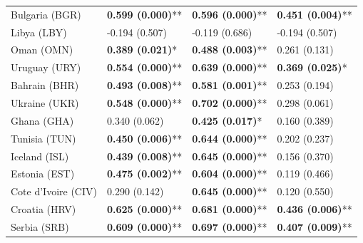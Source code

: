 \begin{longtable}{p{5cm}p{3cm}p{3cm}p{5cm}}
Bulgaria (BGR) & \textcolor{atlLime600}{\textbf{0.599 (0.000)}**} & \textcolor{atlLime600}{\textbf{0.596 (0.000)}**} & \textcolor{atlLime600}{\textbf{0.451 (0.004)}**} \\
Libya (LBY) & \textcolor{atlOrange600}{-0.194 (0.507)} & \textcolor{atlOrange600}{-0.119 (0.686)} & \textcolor{atlOrange600}{-0.194 (0.507)} \\
Oman (OMN) & \textcolor{atlLime600}{\textbf{0.389 (0.021)}*} & \textcolor{atlLime600}{\textbf{0.488 (0.003)}**} & \textcolor{atlOrange600}{0.261 (0.131)} \\
Uruguay (URY) & \textcolor{atlLime600}{\textbf{0.554 (0.000)}**} & \textcolor{atlLime600}{\textbf{0.639 (0.000)}**} & \textcolor{atlLime600}{\textbf{0.369 (0.025)}*} \\
Bahrain (BHR) & \textcolor{atlLime600}{\textbf{0.493 (0.008)}**} & \textcolor{atlLime600}{\textbf{0.581 (0.001)}**} & \textcolor{atlOrange600}{0.253 (0.194)} \\
Ukraine (UKR) & \textcolor{atlLime600}{\textbf{0.548 (0.000)}**} & \textcolor{atlLime600}{\textbf{0.702 (0.000)}**} & \textcolor{atlOrange600}{0.298 (0.061)} \\
Ghana (GHA) & \textcolor{atlOrange600}{0.340 (0.062)} & \textcolor{atlLime600}{\textbf{0.425 (0.017)}*} & \textcolor{atlOrange600}{0.160 (0.389)} \\
Tunisia (TUN) & \textcolor{atlLime600}{\textbf{0.450 (0.006)}**} & \textcolor{atlLime600}{\textbf{0.644 (0.000)}**} & \textcolor{atlOrange600}{0.202 (0.237)} \\
Iceland (ISL) & \textcolor{atlLime600}{\textbf{0.439 (0.008)}**} & \textcolor{atlLime600}{\textbf{0.645 (0.000)}**} & \textcolor{atlOrange600}{0.156 (0.370)} \\
Estonia (EST) & \textcolor{atlLime600}{\textbf{0.475 (0.002)}**} & \textcolor{atlLime600}{\textbf{0.604 (0.000)}**} & \textcolor{atlOrange600}{0.119 (0.466)} \\
Cote d'Ivoire (CIV) & \textcolor{atlOrange600}{0.290 (0.142)} & \textcolor{atlLime600}{\textbf{0.645 (0.000)}**} & \textcolor{atlOrange600}{0.120 (0.550)} \\
Croatia (HRV) & \textcolor{atlLime600}{\textbf{0.625 (0.000)}**} & \textcolor{atlLime600}{\textbf{0.681 (0.000)}**} & \textcolor{atlLime600}{\textbf{0.436 (0.006)}**} \\
Serbia (SRB) & \textcolor{atlLime600}{\textbf{0.609 (0.000)}**} & \textcolor{atlLime600}{\textbf{0.697 (0.000)}**} & \textcolor{atlLime600}{\textbf{0.407 (0.009)}**} \\

\end{longtable}
